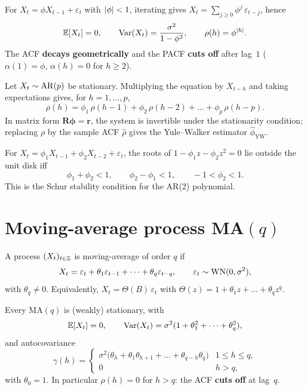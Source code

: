\begin{exbox}[AR$(1)$ moments]
\label{ex:ar1}
For $X_t = \phi X_{t-1} + \varepsilon_t$ with $\left\lvert \phi \right\rvert < 1$,
iterating gives
$X_t = \sum_{j \geq 0} \phi^j\, \varepsilon_{t - j}$, hence
\[
  \mathbb{E}[X_t] = 0,
  \qquad
  \mathrm{Var}(X_t) = \frac{\sigma^2}{1 - \phi^2},
  \qquad
  \rho(h) = \phi^{\left\lvert h \right\rvert}.
\]
The ACF \textbf{decays geometrically} and the PACF \textbf{cuts off}
after lag~$1$ ($\alpha(1) = \phi$, $\alpha(h) = 0$ for $h \geq 2$).
\end{exbox}

\begin{propbox}
\label{prop:yw}
Let $X_t \sim \mathrm{AR}(p)$ be stationary. Multiplying the equation by
$X_{t - h}$ and taking expectations gives, for $h = 1, \dots, p$,
\[
  \rho(h) = \phi_1\, \rho(h - 1) + \phi_2\, \rho(h - 2)
          + \dots + \phi_p\, \rho(h - p).
\]
In matrix form $\bm R \bm \phi = \bm r$, the system is invertible
under the stationarity condition; replacing $\rho$ by the sample
ACF $\widehat\rho$ gives the Yule--Walker estimator
$\widehat\phi_{\text{YW}}$.
\end{propbox}

\begin{exbox}
For $X_t = \phi_1 X_{t-1} + \phi_2 X_{t-2} + \varepsilon_t$, the
roots of $1 - \phi_1 z - \phi_2 z^2 = 0$ lie outside the unit disk
iff
\[
  \phi_1 + \phi_2 < 1,
  \qquad
  \phi_2 - \phi_1 < 1,
  \qquad
  -1 < \phi_2 < 1.
\]
This is the Schur stability condition for the AR(2) polynomial.
\end{exbox}

\section{Moving-average process MA$(q)$}
\label{sec:ma}

\begin{defbox}
\label{def:ma}
A process $(X_t)_{t \in \mathbb{Z}}$ is moving-average of order $q$ if
\[
  X_t = \varepsilon_t + \theta_1 \varepsilon_{t-1}
        + \dots + \theta_q \varepsilon_{t-q},
  \qquad \varepsilon_t \sim \mathrm{WN}(0, \sigma^2),
\]
with $\theta_q \neq 0$. Equivalently, $X_t = \Theta(B)\,
\varepsilon_t$ with $\Theta(z) = 1 + \theta_1 z + \dots + \theta_q
z^q$.
\end{defbox}

\begin{propbox}
\label{prop:ma-acf}
Every MA$(q)$ is (weakly) stationary, with
\[
  \mathbb{E}[X_t] = 0,
  \qquad
  \mathrm{Var}(X_t) = \sigma^2 (1 + \theta_1^2 + \dots + \theta_q^2),
\]
and autocovariance
\[
  \gamma(h) =
  \begin{cases}
    \sigma^2 \bigl(\theta_h + \theta_1 \theta_{h+1} + \dots
                 + \theta_{q-h} \theta_q\bigr)
                                & 1 \leq h \leq q, \\[4pt]
    0                           & h > q,
  \end{cases}
\]
with $\theta_0 = 1$. In particular $\rho(h) = 0$ for $h > q$:
the ACF \textbf{cuts off} at lag~$q$.
\end{propbox}

